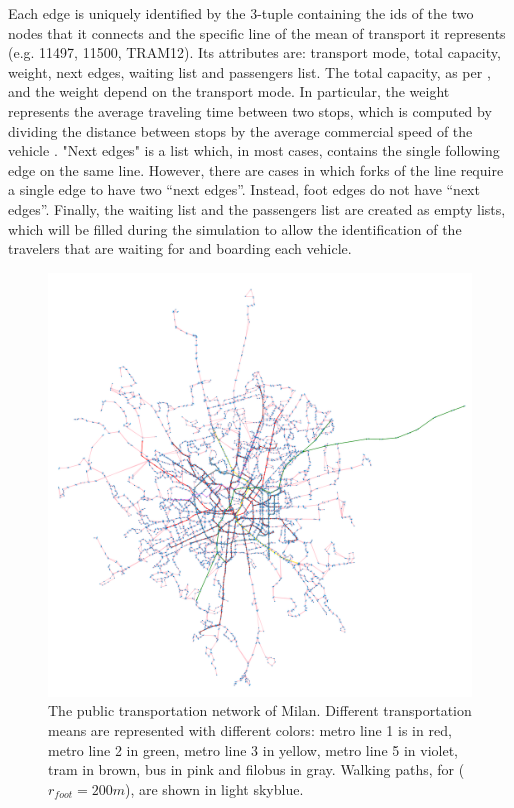 Each edge is uniquely identified by the 3-tuple containing the ids of the two nodes that it connects and the specific line of the mean of transport it represents (e.g. 11497, 11500, TRAM12). Its attributes are: transport mode, total capacity, weight, next edges, waiting list and passengers list. The total capacity, as per \cite{site13,site14,site15,site16}, and the weight depend on the transport mode. In particular, the weight represents the average traveling time between two stops, which is computed by dividing the distance between stops by the average commercial speed of the vehicle \cite{site17}. "Next edges" is a list which, in most cases, contains the single following edge on the same line. However, there are cases in which forks of the line require a single edge to have two “next edges”. Instead, foot edges do not have “next edges”. Finally, the waiting list and the passengers list are created as empty lists, which will be filled during the simulation to allow the identification of the travelers that are waiting for and boarding each vehicle. 

\begin{figure}
    \centering
    \includegraphics[scale = 0.5]{tex/pics/network_complete_cut.png}
    \caption{The public transportation network of Milan. Different transportation means are represented with different colors: metro line 1 is in red, metro line 2 in green, metro line 3 in yellow, metro line 5 in violet, tram in brown, bus in pink and filobus in gray. Walking paths, for ($r_{foot} = 200 m$), are shown in light skyblue.}
    \label{network_complete}
\end{figure}

